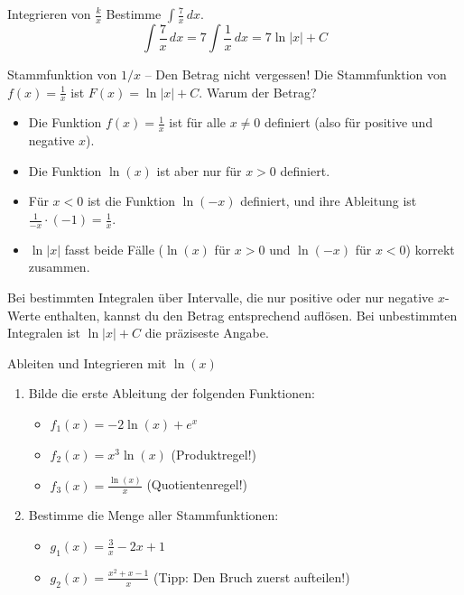 \begin{beispielumgebung}{Integrieren von \texorpdfstring{$\frac{k}{x}$}{k/x}}
Bestimme $\int \frac{7}{x} \,dx$.
\[ \int \frac{7}{x} \,dx = 7 \int \frac{1}{x} \,dx = 7 \ln|x| + C \]
\end{beispielumgebung}

\begin{fehlerboxumgebung}{Stammfunktion von $1/x$ – Den Betrag nicht vergessen!}
Die Stammfunktion von $f(x)=\frac{1}{x}$ ist $F(x)=\ln|x|+C$. Warum der Betrag?
\begin{itemize}
    \item Die Funktion $f(x)=\frac{1}{x}$ ist für alle $x \neq 0$ definiert (also für positive und negative $x$).
    \item Die Funktion $\ln(x)$ ist aber nur für $x>0$ definiert.
    \item Für $x<0$ ist die Funktion $\ln(-x)$ definiert, und ihre Ableitung ist $\frac{1}{-x} \cdot (-1) = \frac{1}{x}$.
    \item $\ln|x|$ fasst beide Fälle ($\ln(x)$ für $x>0$ und $\ln(-x)$ für $x<0$) korrekt zusammen.
\end{itemize}
Bei bestimmten Integralen über Intervalle, die nur positive oder nur negative $x$-Werte enthalten, kannst du den Betrag entsprechend auflösen. Bei unbestimmten Integralen ist $\ln|x|+C$ die präziseste Angabe.
\end{fehlerboxumgebung}

\begin{aufgabenumgebung}{Ableiten und Integrieren mit \texorpdfstring{$\ln(x)$}{ln(x)}}
\begin{enumerate}
    \item Bilde die erste Ableitung der folgenden Funktionen:
        \begin{itemize}
            \item $f_1(x) = -2\ln(x) + e^x$
            \item $f_2(x) = x^3 \ln(x)$ (Produktregel!)
            \item $f_3(x) = \frac{\ln(x)}{x}$ (Quotientenregel!)
        \end{itemize}
    \item Bestimme die Menge aller Stammfunktionen:
        \begin{itemize}
            \item $g_1(x) = \frac{3}{x} - 2x + 1$
            \item $g_2(x) = \frac{x^2+x-1}{x}$ (Tipp: Den Bruch zuerst aufteilen!)
        \end{itemize}
\end{enumerate}
\end{aufgabenumgebung}

